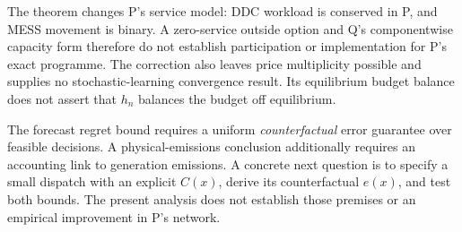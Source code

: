 \documentclass{article}
\begin{document}
The theorem changes P's service model: DDC workload is conserved in P, and MESS movement is binary. A zero-service outside option and Q's componentwise capacity form therefore do not establish participation or implementation for P's exact programme. The correction also leaves price multiplicity possible and supplies no stochastic-learning convergence result. Its equilibrium budget balance does not assert that \(h_n\) balances the budget off equilibrium. %

The forecast regret bound requires a uniform \emph{counterfactual} error guarantee over feasible decisions. A physical-emissions conclusion additionally requires an accounting link to generation emissions. A concrete next question is to specify a small dispatch with an explicit \(C(x)\), derive its counterfactual \(e(x)\), and test both bounds. The present analysis does not establish those premises or an empirical improvement in P's network. %



\end{document}
